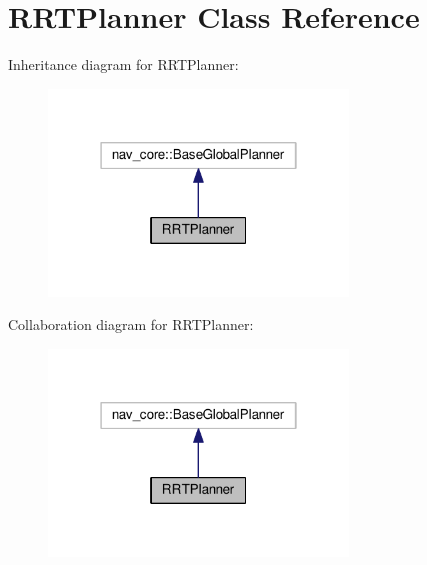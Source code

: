 \hypertarget{classRRTPlanner}{}\section{R\+R\+T\+Planner Class Reference}
\label{classRRTPlanner}


Inheritance diagram for R\+R\+T\+Planner\+:\nopagebreak
\begin{figure}[H]
\begin{center}
\leavevmode
\includegraphics[width=226pt]{classRRTPlanner__inherit__graph}
\end{center}
\end{figure}


Collaboration diagram for R\+R\+T\+Planner\+:\nopagebreak
\begin{figure}[H]
\begin{center}
\leavevmode
\includegraphics[width=226pt]{classRRTPlanner__coll__graph}
\end{center}
\end{figure}
